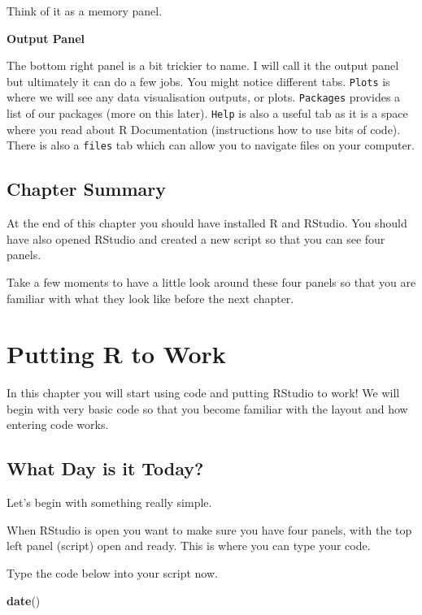 \documentclass[
]{book}
\newenvironment{Shaded}{\begin{snugshade}}{\end{snugshade}}
\newcommand{\FunctionTok}[1]{\textcolor[rgb]{0.13,0.29,0.53}{\textbf{#1}}}
\newcommand{\NormalTok}[1]{#1}
\let\oldsection\section
\renewcommand{\section}{\needspace{5\baselineskip}\oldsection}
\begin{document}
Think of it as a memory panel.

\textbf{Output Panel}

The bottom right panel is a bit trickier to name. I will call it the output panel but ultimately it can do a few jobs. You might notice different tabs. \texttt{Plots} is where we will see any data visualisation outputs, or plots. \texttt{Packages} provides a list of our packages (more on this later). \texttt{Help} is also a useful tab as it is a space where you read about R Documentation (instructions how to use bits of code). There is also a \texttt{files} tab which can allow you to navigate files on your computer.

\section{Chapter Summary}\label{chapter-summary}

At the end of this chapter you should have installed R and RStudio. You should have also opened RStudio and created a new script so that you can see four panels.

Take a few moments to have a little look around these four panels so that you are familiar with what they look like before the next chapter.

\chapter{Putting R to Work}\label{putting-r-to-work}

In this chapter you will start using code and putting RStudio to work! We will begin with very basic code so that you become familiar with the layout and how entering code works.

\section{What Day is it Today?}\label{what-day-is-it-today}

Let's begin with something really simple.

When RStudio is open you want to make sure you have four panels, with the top left panel (script) open and ready. This is where you can type your code.

Type the code below into your script now.

\begin{Shaded}
\begin{Highlighting}[]
\FunctionTok{date}\NormalTok{()}
\end{Highlighting}
\end{Shaded}
\end{document}

